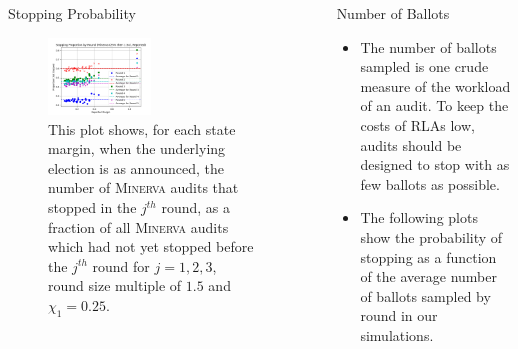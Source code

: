 \documentclass[final]{beamer}
\newcommand{\Minerva}{\textsc{Minerva}\xspace}
\newlength{\sepwidth}
\newlength{\colwidth}
\newcommand{\separatorcolumn}{\begin{column}{\sepwidth}\end{column}}
\begin{document}
\begin{frame}[t]
\begin{columns}[t]
\begin{column}{\colwidth}
\begin{block}{Stopping Probability}
\begin{figure}
\begin{centering}
\includegraphics[width=0.5\textwidth]{minerva25percthen1p5_sprob.png}
\caption{This plot shows, for each state margin, when the underlying election is as announced, the number of \Minerva audits that stopped in the $j^{th}$ round,
as a fraction of all \Minerva audits which had not yet stopped before the $j^{th}$ round for $j=1,2,3$, round size multiple of $1.5$ and $\chi_1 = 0.25$.}
\label{fig:minerva_25}
\end{centering}
\end{figure}

\end{block}

\end{column}

\separatorcolumn

\begin{column}{\colwidth}

\begin{block}{Number of Ballots}

\begin{itemize}
\item
The number of ballots sampled is one crude measure of the workload of an audit.
To keep the costs of RLAs low, audits should be designed to stop with as few ballots as possible.
\item
The following plots show the probability of stopping as a function of the average number of ballots
sampled by round in our simulations.
\end{itemize}


\end{block}
\end{column}
\end{columns}
\end{frame}
\end{document}
